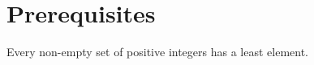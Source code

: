 \chapter{Prerequisites}

\begin{Def}

    \label{def:well_ordering_principle}

    Every non-empty set of positive integers has a least element.
\end{Def}




\newpage

